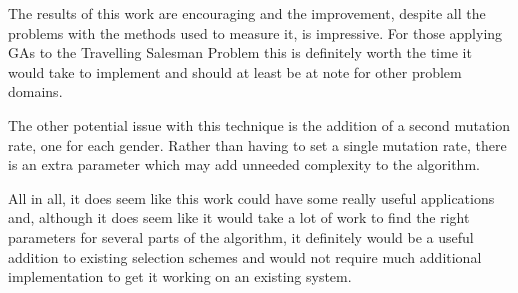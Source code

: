 \documentclass[10pt, a4paper]{article}
\begin{document}
The results of this work are encouraging and the improvement, despite all the
problems with the methods used to measure it, is impressive. For those applying
GAs to the Travelling Salesman Problem this is definitely worth the time it
would take to implement and should at least be at note for other problem
domains.

The other potential issue with this technique is the addition of a second
mutation rate, one for each gender. Rather than having to set a single mutation
rate, there is an extra parameter which may add unneeded complexity to the
algorithm.

All in all, it does seem like this work could have some really useful
applications and, although it does seem like it would take a lot of work to find
the right parameters for several parts of the algorithm, it definitely would be
a useful addition to existing selection schemes and would not require much
additional implementation to get it working on an existing system.

\newpage


\end{document}
